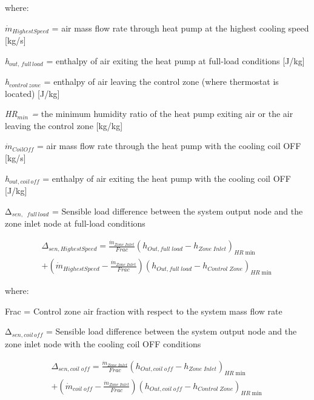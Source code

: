 where:

\emph{\({\dot m}_{HighestSpeed}\)} = air mass flow rate through heat pump at the highest cooling speed {[}kg/s{]}

\emph{h\(_{out,\, full\, load}\)} = enthalpy of air exiting the heat pump at full-load conditions {[}J/kg{]}

\emph{h\(_{control \, zone}\)} = enthalpy of air leaving the control zone (where thermostat is located) {[}J/kg{]}

\emph{HR\(_{min}\) =} the minimum humidity ratio of the heat pump exiting air or the air leaving the control zone {[}kg/kg{]}

\({\dot m}_{CoilOff}\) = air mass flow rate through the heat pump with the cooling coil OFF {[}kg/s{]}

\emph{h\(_{out,coil \, off}\)} = enthalpy of air exiting the heat pump with the cooling coil OFF {[}J/kg{]}

Δ\(_{sen,}\) \emph{\(_{full\, load}\)} = Sensible load difference between the system output node and the zone inlet node at full-load conditions

\begin{equation}
\begin{split}
{\Delta_{sen,HighestSpeed}} = \frac{{{{\dot m}_{Zone\;Inlet}}}}{{Frac}}{\left( {{h_{Out,full\;load}} - {h_{Zone\;Inlet}}} \right)_{HR\min }} \\
+ \left( {{{\dot m}_{HighestSpeed}} - \frac{{{{\dot m}_{Zone\;Inlet}}}}{{Frac}}} \right){\left( {h_{Out,full\;load} - {h_{Control\;Zone}}} \right)_{HR\min }}
\end{split}
\end{equation}

where:

Frac = Control zone air fraction with respect to the system mass flow rate

Δ\(_{sen,coil\, off}\) = Sensible load difference between the system output node and the zone inlet node with the cooling coil OFF conditions

\begin{equation}
\begin{split}
{\Delta_{sen,coil\;off}} = \frac{{{{\dot m}_{Zone\;Inlet}}}}{{Frac}}{\left( {{h_{Out,coil\;off}} - {h_{Zone\;Inlet}}} \right)_{HR\min }} \\ 
+ \left( {{{\dot m}_{coil\;off}} - \frac{{{{\dot m}_{Zone\;Inlet}}}}{{Frac}}} \right){\left( {{h_{Out,coil\;off}} - {h_{Control\;Zone}}} \right)_{HR\min }}
\end{split}
\end{equation}

